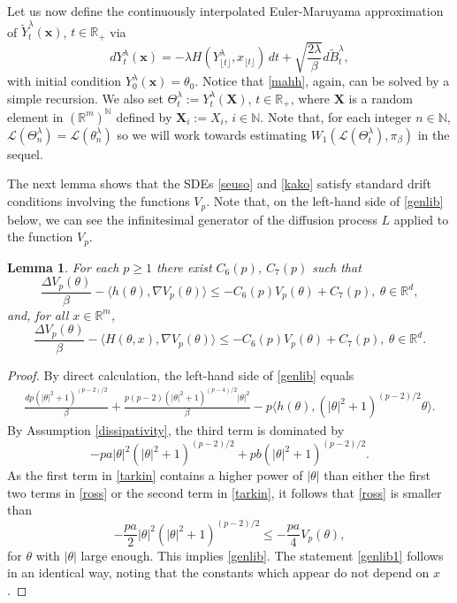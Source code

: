 \documentclass[a4paper,draft]{article}
\newtheorem{lemma}[theorem]{Lemma}
\begin{document}
Let us now define the continuously interpolated
Euler-Maruyama approximation of $\tilde{Y}^{\lambda}_t(\mathbf{x})$, $t\in\mathbb{R}_+$ via
\begin{equation}\label{mahh}
dY^{\lambda}_t(\mathbf{x})=-\lambda H(Y^{\lambda}_{\lfloor t\rfloor},{x}_{\lfloor t\rfloor})\, dt
+ \sqrt{\frac{2\lambda}{\beta}} d\tilde{B}^{\lambda}_{t},
\end{equation}
with initial condition $Y^{\lambda}_0(\mathbf{x})=\theta_0$.
Notice that \eqref{mahh}, again, can be solved by a simple recursion.
We also set $\Theta_t^{\lambda}:=Y^{\lambda}_t(\mathbf{X})$, $t\in\mathbb{R}_+$,
where $\mathbf{X}$ is a random element in $(\mathbb{R}^m)^{\mathbb{N}}$
defined by $\mathbf{X}_i:=X_i$, $i\in\mathbb{N}$.
Note that, for each integer $n\in\mathbb{N}$, $\mathcal{L}({\Theta}^{\lambda}_n)=\mathcal{L}(\theta_n^{\lambda})$ so we will work towards estimating $W_1(\mathcal{L}(\Theta^{\lambda}_t),\pi_{\beta})$
in the sequel.



The next lemma shows that the SDEs \eqref{seuso} and \eqref{kako} satisfy standard drift conditions
involving the functions $V_p$. Note that, on the left-hand side of \eqref{genlib} below,
we can see the infinitesimal generator of the diffusion process $L$ applied to
the function $V_p$.

\begin{lemma}\label{lyapp} For each $p\geq 1$ there exist
$C_6(p)$, $C_7(p)$
such that
\begin{equation}\label{genlib}
\frac{\Delta V_p(\theta)}{\beta}-\langle h(\theta),\nabla V_p(\theta)\rangle\leq
-C_6(p) V_p(\theta)+C_7(p),\ \theta\in\mathbb{R}^d,
\end{equation}
and, for all $x\in\mathbb{R}^m$,
\begin{equation}\label{genlib1}
\frac{\Delta V_p(\theta)}{\beta}-\langle H(\theta,x),\nabla V_p(\theta)\rangle\leq
-C_6(p) V_p(\theta)+C_7(p),\ \theta\in\mathbb{R}^d.
\end{equation}
\end{lemma}
\begin{proof}
By direct calculation, the left-hand side of \eqref{genlib} equals
\begin{eqnarray}\label{ross}
\frac{dp(|\theta|^2+1)^{(p-2)/2}}{\beta}+\frac{p(p-2)(|\theta|^2+1)^{(p-4)/2}|\theta|^2}{\beta}-
p\langle h(\theta),(|\theta|^2+1)^{(p-2)/2}\theta\rangle.
\end{eqnarray}
By Assumption \ref{dissipativity}, the third term is dominated by
\begin{equation}\label{tarkin}
-pa |\theta|^2(|\theta|^2+1)^{(p-2)/2}+pb(|\theta|^2+1)^{(p-2)/2}.
\end{equation}
As the first term in \eqref{tarkin} contains a higher power
of $|\theta|$ than either the first two terms in \eqref{ross} or
the second term in \eqref{tarkin},
it follows that \eqref{ross} is smaller than
$$
-\frac{pa}{2} |\theta|^2(|\theta|^2+1)^{(p-2)/2}\leq -\frac{pa}{4}V_p(\theta),
$$
for $\theta$ with $|\theta|$ large enough. This implies \eqref{genlib}.
The statement \eqref{genlib1} follows in an identical way, noting that the
constants which appear do not depend on $x$.
\end{proof}
\end{document}
